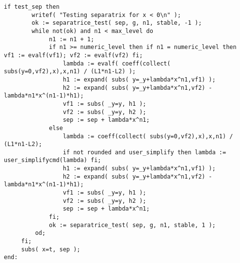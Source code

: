 \documentclass[a4paper,10pt]{article}
\begin{document}
\begin{lstlisting}[name=type]
    if test_sep then
        writef( "Testing separatrix for x < 0\n" );
        ok := separatrice_test( sep, g, n1, stable, -1 );
        while not(ok) and n1 < max_level do
             n1 := n1 + 1;
             if n1 >= numeric_level then if n1 = numeric_level then vf1 := evalf(vf1); vf2 := evalf(vf2) fi;
                 lambda := evalf( coeff(collect( subs(y=0,vf2),x),x,n1) / (L1*n1-L2) );
                 h1 := expand( subs( y=_y+lambda*x^n1,vf1) );
                 h2 := expand( subs( y=_y+lambda*x^n1,vf2) - lambda*n1*x^(n1-1)*h1);
                 vf1 := subs( _y=y, h1 );
                 vf2 := subs( _y=y, h2 );
                 sep := sep + lambda*x^n1;
             else
                 lambda := coeff(collect( subs(y=0,vf2),x),x,n1) / (L1*n1-L2);
                 if not rounded and user_simplify then lambda := user_simplifycmd(lambda) fi;
                 h1 := expand( subs( y=_y+lambda*x^n1,vf1) );
                 h2 := expand( subs( y=_y+lambda*x^n1,vf2) - lambda*n1*x^(n1-1)*h1);
                 vf1 := subs( _y=y, h1 );
                 vf2 := subs( _y=y, h2 );
                 sep := sep + lambda*x^n1;
             fi;
             ok := separatrice_test( sep, g, n1, stable, 1 );
         od;
     fi;
     subs( x=t, sep );
end:
\end{lstlisting}
\end{document}
